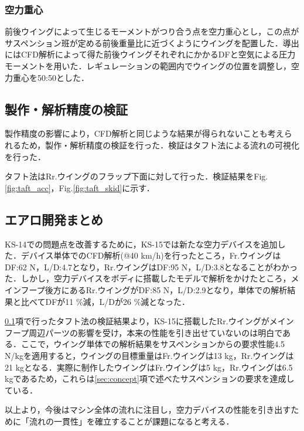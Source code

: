 \subsubsection{空力重心}
前後ウイングによって生じるモーメントがつり合う点を空力重心とし，この点がサスペンション班が定める前後重量比に近づくようにウイングを配置した．導出にはCFD解析によって得た前後ウイングそれぞれにかかるDFと空気による圧力モーメントを用いた．レギュレーションの範囲内でウイングの位置を調整し，空力重心を50:50とした．

\subsection{製作・解析精度の検証}
\label{sec:experiment}
製作精度の影響により，CFD解析と同じような結果が得られないことも考えられるため，製作・解析精度の検証を行った．検証はタフト法による流れの可視化を行った．


タフト法はRr.ウイングのフラップ下面に対して行った．検証結果をFig.\ref{fig:taft_acc}，Fig.\ref{fig:taft_skid}に示す．


\subsection{エアロ開発まとめ}
KS-14での問題点を改善するために，KS-15では新たな空力デバイスを追加した．デバイス単体でのCFD解析(@40 km/h)を行ったところ，Fr.ウイングはDF:62 N，L/D:4.7となり，Rr.ウイングはDF:95 N，L/D:3.8となることがわかった．しかし，空力デバイスをボディに搭載したモデルで解析をかけたところ，メインフープ後方にあるRr.ウイングがDF:85 N，L/D:2.9となり，単体での解析結果と比べてDFが11 \%減，L/Dが26 \%減となった．

\ref{sec:experiment}項で行ったタフト法の検証結果より，KS-15に搭載したRr.ウイングがメインフープ周辺パーツの影響を受け，本来の性能を引き出せていないのは明白である．ここで，ウイング単体での解析結果をサスペンションからの要求性能4.5 N/kgを適用すると，ウイングの目標重量はFr.ウイングは13 kg，Rr.ウイングは21 kgとなる．実際に制作したウイングはFr.ウイングは5 kg，Rr.ウイングは6.5 kgであるため，これらは\ref{sec:concept}項で述べたサスペンションの要求を達成している．

以上より，今後はマシン全体の流れに注目し，空力デバイスの性能を引き出すために「流れの一貫性」を確立することが課題になると考える．
